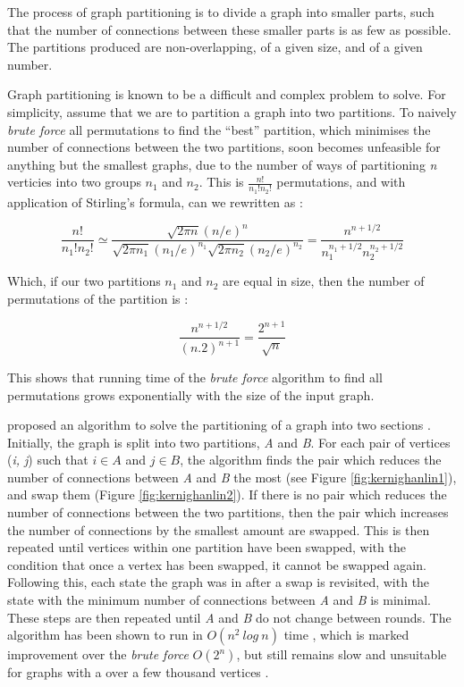 The process of graph partitioning is to divide a graph into smaller parts, such that the number of connections between these smaller parts is as few as possible. The partitions produced are non-overlapping, of a given size, and of a given number.

Graph partitioning is known to be a difficult and complex problem to solve. For simplicity, assume that we are to partition a graph into two partitions. To naively \emph{brute force} all permutations to find the ``best'' partition, which minimises the number of connections between the two partitions, soon becomes unfeasible for anything but the smallest graphs, due to the number of ways of partitioning \emph{n} verticies into two groups \emph{$n_1$} and \emph{$n_2$}. This is $\frac{n!}{n_1!n_2!}$ permutations, and with application of Stirling's formula, can we rewritten as \cite{newman10}:

\begin{equation}
\frac{n!}{n_1!n_2!} \simeq \frac{\sqrt{2\pi n}(n/e)^n}{\sqrt{2\pi n_1}(n_1/e)^{n_1} \sqrt{2\pi n_2}(n_2/e)^{n_2}} = \frac{n^{n+1/2}}{n_1^{n_1+1/2} n_2^{n_2+1/2}} 
\label{eq:partioning1}
\end{equation}

Which, if our two partitions $n_1$ and $n_2$ are equal in size, then the number of permutations of the partition is \cite{newman10}:

\begin{equation}
\frac{n^{n+1/2}}{(n.2)^{n+1}} = \frac{2^{n+1}}{\sqrt{n}}
\label{eq:}
\end{equation}

This shows that running time of the \emph{brute force} algorithm to find all permutations grows exponentially with the size of the input graph.

\citeauthor{kernighan70} proposed an algorithm to solve the partitioning of a graph into two sections \cite{kernighan70}. Initially, the graph is split into two partitions, \emph{A} and \emph{B}. For each pair of vertices (\emph{i, j}) such that $i \in A$ and $j \in B$, the algorithm finds the pair which reduces the number of connections between \emph{A} and \emph{B} the most (see Figure \ref{fig:kernighanlin1}), and swap them (Figure \ref{fig:kernighanlin2}). If there is no pair which reduces the number of connections between the two partitions, then the pair which increases the number of connections by the smallest amount are swapped. This is then repeated until vertices within one partition have been swapped, with the condition that once a vertex has been swapped, it cannot be swapped again. Following this, each state the graph was in after a swap is revisited, with the state with the minimum number of connections between \emph{A} and \emph{B} is minimal. These steps are then repeated until \emph{A} and \emph{B} do not change between rounds. The algorithm has been shown to run in $O(n^2\: log\: n)$ time \cite{kernighan70}, which is marked improvement over the \emph{brute force} $O(2^n)$, but still remains slow and unsuitable for graphs with a over a few thousand vertices \cite{newman10}.

